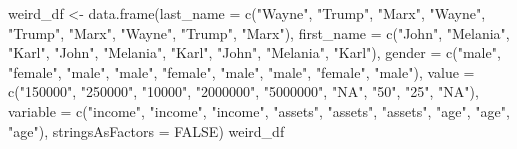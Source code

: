\documentclass[
  12pt,
]{style/krantz}
\newenvironment{Shaded}{\begin{snugshade}}{\end{snugshade}}
\newcommand{\AttributeTok}[1]{\textcolor[rgb]{0.77,0.63,0.00}{#1}}
\newcommand{\ConstantTok}[1]{\textcolor[rgb]{0.00,0.00,0.00}{#1}}
\newcommand{\FunctionTok}[1]{\textcolor[rgb]{0.00,0.00,0.00}{#1}}
\newcommand{\NormalTok}[1]{#1}
\newcommand{\OtherTok}[1]{\textcolor[rgb]{0.56,0.35,0.01}{#1}}
\newcommand{\StringTok}[1]{\textcolor[rgb]{0.31,0.60,0.02}{#1}}
\begin{document}
\begin{Shaded}
\begin{Highlighting}[]
\NormalTok{weird\_df }\OtherTok{\textless{}{-}} \FunctionTok{data.frame}\NormalTok{(}\AttributeTok{last\_name =} \FunctionTok{c}\NormalTok{(}\StringTok{"Wayne"}\NormalTok{, }\StringTok{"Trump"}\NormalTok{, }\StringTok{"Marx"}\NormalTok{,}
                                     \StringTok{"Wayne"}\NormalTok{, }\StringTok{"Trump"}\NormalTok{, }\StringTok{"Marx"}\NormalTok{,}
                                     \StringTok{"Wayne"}\NormalTok{, }\StringTok{"Trump"}\NormalTok{, }\StringTok{"Marx"}\NormalTok{),}
                       \AttributeTok{first\_name =} \FunctionTok{c}\NormalTok{(}\StringTok{"John"}\NormalTok{, }\StringTok{"Melania"}\NormalTok{, }\StringTok{"Karl"}\NormalTok{,}
                                      \StringTok{"John"}\NormalTok{, }\StringTok{"Melania"}\NormalTok{, }\StringTok{"Karl"}\NormalTok{,}
                                      \StringTok{"John"}\NormalTok{, }\StringTok{"Melania"}\NormalTok{, }\StringTok{"Karl"}\NormalTok{),}
                       \AttributeTok{gender =} \FunctionTok{c}\NormalTok{(}\StringTok{"male"}\NormalTok{, }\StringTok{"female"}\NormalTok{, }\StringTok{"male"}\NormalTok{,}
                                  \StringTok{"male"}\NormalTok{, }\StringTok{"female"}\NormalTok{, }\StringTok{"male"}\NormalTok{,}
                                  \StringTok{"male"}\NormalTok{, }\StringTok{"female"}\NormalTok{, }\StringTok{"male"}\NormalTok{),}
                       \AttributeTok{value =} \FunctionTok{c}\NormalTok{(}\StringTok{"150000"}\NormalTok{, }\StringTok{"250000"}\NormalTok{, }\StringTok{"10000"}\NormalTok{,}
                                 \StringTok{"2000000"}\NormalTok{, }\StringTok{"5000000"}\NormalTok{, }\StringTok{"NA"}\NormalTok{,}
                                 \StringTok{"50"}\NormalTok{, }\StringTok{"25"}\NormalTok{, }\StringTok{"NA"}\NormalTok{),}
                       \AttributeTok{variable =} \FunctionTok{c}\NormalTok{(}\StringTok{"income"}\NormalTok{, }\StringTok{"income"}\NormalTok{, }\StringTok{"income"}\NormalTok{,}
                                    \StringTok{"assets"}\NormalTok{, }\StringTok{"assets"}\NormalTok{, }\StringTok{"assets"}\NormalTok{,}
                                    \StringTok{"age"}\NormalTok{, }\StringTok{"age"}\NormalTok{, }\StringTok{"age"}\NormalTok{),}
                       \AttributeTok{stringsAsFactors =} \ConstantTok{FALSE}\NormalTok{)}
\NormalTok{weird\_df}
\end{Highlighting}
\end{Shaded}
\end{document}

